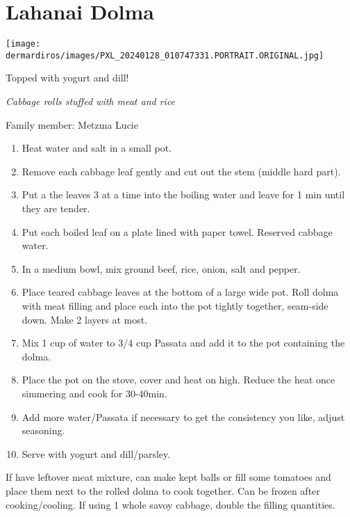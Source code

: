\chapter{Lahanai Dolma}
\label{ch:lahanai_dolma}


\begin{marginfigure}[20pt]
  \texttt{[image: dermardiros/images/PXL\_20240128\_010747331.PORTRAIT.ORIGINAL.jpg]}
  \caption{Topped with yogurt and dill!}
\end{marginfigure}

\textit{Cabbage rolls stuffed with meat and rice}

Family member: Metzma Lucie

\begin{enumerate}
    \item Heat water and salt in a small pot.
    \item Remove each cabbage leaf gently and cut out the stem (middle hard part).
    \item Put a the leaves 3 at a time into the boiling water and leave for 1 min until they are tender.
    \item Put each boiled leaf on a plate lined with paper towel. Reserved cabbage water.
    \item In a medium bowl, mix ground beef, rice, onion, salt and pepper.
    \item Place teared cabbage leaves at the bottom of a large wide pot. Roll dolma with meat filling and place each into the pot tightly together, seam-side down. Make 2 layers at most.
    \item Mix 1 cup of water to 3/4 cup Passata and add it to the pot containing the dolma.
    \item Place the pot on the stove, cover and heat on high. Reduce the heat once simmering and cook for 30-40min.
    \item Add more water/Passata if necessary to get the consistency you like, adjust seasoning.
    \item Serve with yogurt and dill/parsley.
\end{enumerate}

If have leftover meat mixture, can make kept balls or fill some tomatoes and place them next to the rolled dolma to cook together.
Can be frozen after cooking/cooling.
If using 1 whole savoy cabbage, double the filling quantities.
